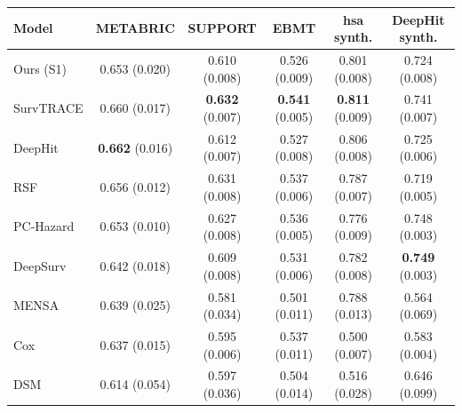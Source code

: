 \begin{tabular}{lccccc}
\toprule
Model & METABRIC & SUPPORT & EBMT & hsa synth. & DeepHit synth. \\
\midrule
Ours (S1) & 0.653 (0.020) & 0.610 (0.008) & 0.526 (0.009) & 0.801 (0.008) & 0.724 (0.008) \\
SurvTRACE & 0.660 (0.017) & \textbf{0.632} (0.007) & \textbf{0.541} (0.005) & \textbf{0.811} (0.009) & 0.741 (0.007) \\
DeepHit & \textbf{0.662} (0.016) & 0.612 (0.007) & 0.527 (0.008) & 0.806 (0.008) & 0.725 (0.006) \\
RSF & 0.656 (0.012) & 0.631 (0.008) & 0.537 (0.006) & 0.787 (0.007) & 0.719 (0.005) \\
PC-Hazard & 0.653 (0.010) & 0.627 (0.008) & 0.536 (0.005) & 0.776 (0.009) & 0.748 (0.003) \\
DeepSurv & 0.642 (0.018) & 0.609 (0.008) & 0.531 (0.006) & 0.782 (0.008) & \textbf{0.749} (0.003) \\
MENSA & 0.639 (0.025) & 0.581 (0.034) & 0.501 (0.011) & 0.788 (0.013) & 0.564 (0.069) \\
Cox & 0.637 (0.015) & 0.595 (0.006) & 0.537 (0.011) & 0.500 (0.007) & 0.583 (0.004) \\
DSM & 0.614 (0.054) & 0.597 (0.036) & 0.504 (0.014) & 0.516 (0.028) & 0.646 (0.099) \\
\bottomrule
\end{tabular}
